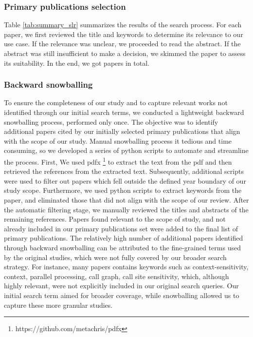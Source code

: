 \subsubsection{Primary publications selection}
Table \ref{tab:summary_slr} summarizes the results of the search process. For each paper, we first reviewed the title and keywords to determine its relevance to our use case. If the relevance was unclear, we proceeded to read the abstract. If the abstract was still insufficient to make a decision, we skimmed the paper to assess its suitability.
In the end, we got \noofpapers papers in total.

\subsubsection{Backward snowballing}
To ensure the completeness of our study and to capture relevant works not identified through our initial search terms, we conducted a lightweight backward snowballing process, performed only once.
The objective was to identify additional papers cited by our initially selected primary publications that align with the scope of our study.
Manual snowballing process it tedious and time consuming, so we developed a series of python scripts to automate and streamline the process.
First, We used pdfx \footnote{https://github.com/metachris/pdfx} to extract the text from the pdf and then retrieved the references from the extracted text.
Subsequently, additional scripts were used to filter out papers which fell outside the defined year boundary of our study scope.
Furthermore, we used python scripts to extract keywords from the paper, and eliminated those that did not align with the scope of our review.
After the automatic filtering stage, we manually reviewed the titles and abstracts of the remaining references. 
Papers found relevant to the scope of study, and not already included in our primary publications set were added to the final list of primary publications.
The relatively high number of additional papers identified through backward snowballing can be attributed to the fine-grained terms used by the original studies, which were not fully covered by our broader search strategy.
For instance, many papers contains keywords such as context-sensitivity, context, parallel processing, call graph, call site sensitivity, which, although highly relevant, were not explicitly included in our original search queries.
Our initial search term aimed for broader coverage, while snowballing allowed us to capture these more granular studies.


